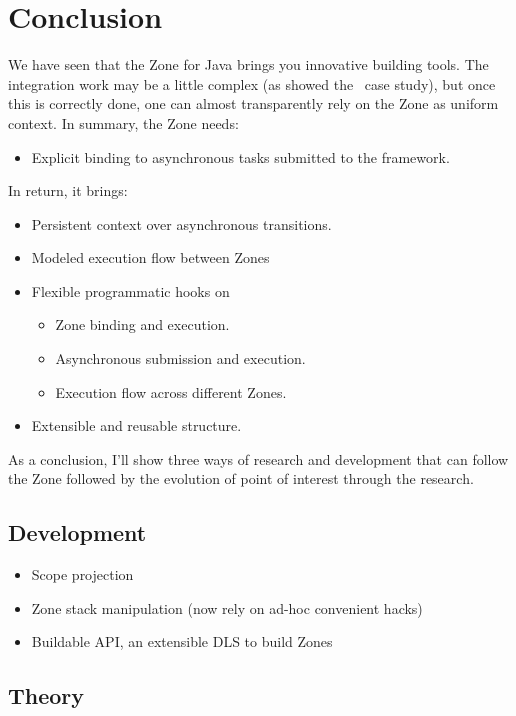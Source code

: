 
\chapter{Conclusion}
\label{ch:conclusion}

We have seen that the Zone for Java brings you innovative building tools. The integration work may be a little complex (as showed the \vertx\ case study), but once this is correctly done, one can almost transparently rely on the Zone as uniform context. In summary, the Zone needs:
\begin{itemize}
\item Explicit binding to asynchronous tasks submitted to the framework.
\end{itemize}

In return, it brings:
\begin{itemize}
\item Persistent context over asynchronous transitions.
\item Modeled execution flow between Zones
\item Flexible programmatic hooks on
  \begin{itemize}
  \item Zone binding and execution.
  \item Asynchronous submission and execution.
  \item Execution flow across different Zones.
  \end{itemize}
\item Extensible and reusable structure.
\end{itemize}

As a conclusion, I'll show three ways of research and development that can follow the Zone followed by the evolution of point of interest through the research.

\section{Development}

\begin{itemize}
\item Scope projection
\item Zone stack manipulation (now rely on ad-hoc convenient hacks)
\item Buildable API, an extensible DLS to build Zones
\end{itemize}

\section{Theory}


